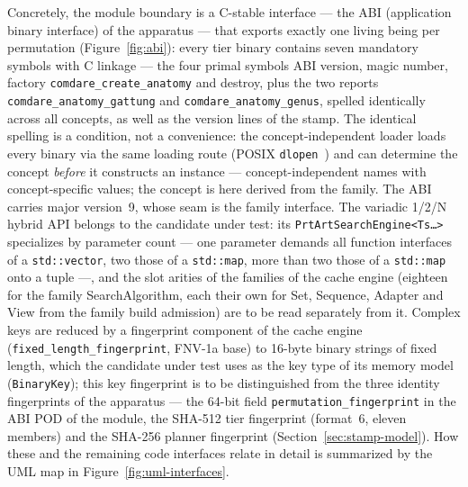 \begin{nurlang}
Concretely, the module boundary is a C-stable interface --- the ABI (application binary interface) of
the apparatus --- that exports exactly one living being per permutation (Figure~\ref{fig:abi}): every
tier binary contains seven mandatory symbols with C linkage --- the four primal symbols ABI version,
magic number, factory \texttt{comdare\_\allowbreak{}create\_\allowbreak{}anatomy} and destroy, plus the
two reports \texttt{comdare\_\allowbreak{}anatomy\_\allowbreak{}gattung} and
\texttt{comdare\_\allowbreak{}anatomy\_\allowbreak{}genus}, spelled identically across all concepts, as
well as the version lines of the stamp. The identical spelling is a condition, not a convenience: the
concept-independent loader loads every binary via the same loading route (POSIX
\texttt{dlopen}~\cite{posix_dlopen}) and can determine the concept \emph{before} it constructs an
instance --- concept-independent names with concept-specific values; the concept is here derived from the
family. The ABI carries major version~9, whose seam is the family interface. The variadic 1/2/N hybrid
API belongs to the candidate under test: its \texttt{PrtArtSearchEngine<Ts\ldots>} specializes by parameter count ---
one parameter demands all function interfaces of a \texttt{std::vector}, two those of a
\texttt{std::map}, more than two those of a \texttt{std::map} onto a tuple ---, and the slot arities of
the families of the cache engine (eighteen for the family SearchAlgorithm, each their own for Set,
Sequence, Adapter and View from the family build admission) are to be read separately from it. Complex
keys are reduced by a fingerprint component of the cache engine
(\texttt{fixed\_\allowbreak{}length\_\allowbreak{}fingerprint}, FNV-1a base) to 16-byte binary strings
of fixed length, which the candidate under test uses as the key type of its memory model (\texttt{BinaryKey}); this key
fingerprint is to be distinguished from the three identity fingerprints of the apparatus --- the 64-bit
field \texttt{permutation\_\allowbreak{}fingerprint} in the ABI POD of the module, the SHA-512 tier
fingerprint (format~6, eleven members) and the SHA-256 planner fingerprint
(Section~\ref{sec:stamp-model}). How these and the remaining code interfaces relate in detail is
summarized by the UML map in Figure~\ref{fig:uml-interfaces}.
\end{nurlang}
